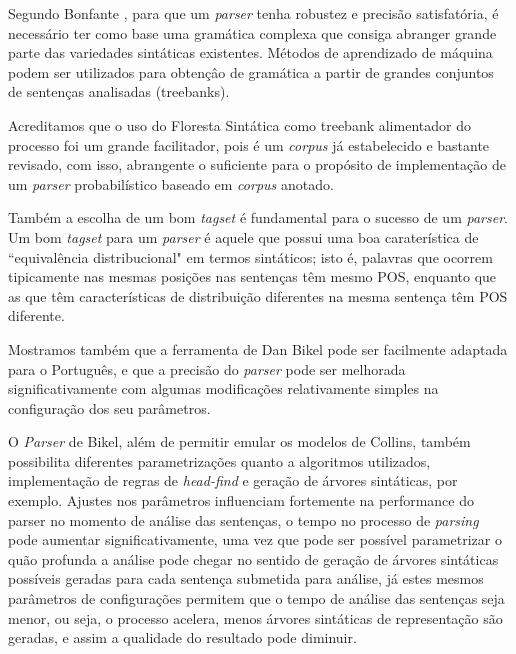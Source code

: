 Segundo Bonfante \cite{bonfante03}, para que um \emph{parser} tenha robustez e precisão satisfatória, é necessário ter como base uma gramática complexa que consiga abranger grande parte das variedades sintáticas existentes. Métodos de aprendizado de máquina podem ser utilizados para obtençâo de gramática a partir de grandes conjuntos de sentenças analisadas (treebanks). 

Acreditamos que o uso do Floresta Sintática como treebank alimentador do processo foi um grande facilitador, pois é um \emph{corpus} já estabelecido e bastante revisado, com isso, abrangente o suficiente para o propósito de implementação de um \emph{parser} probabilístico baseado em \emph{corpus} anotado.

Também a escolha de um bom \emph{tagset} é fundamental para o sucesso de um \emph{parser}. Um bom \emph{tagset} para um \emph{parser} é aquele que possui uma boa caraterística de ``equivalência distribucional" em termos sintáticos; isto é, palavras que ocorrem tipicamente nas mesmas posições nas sentenças têm mesmo POS, enquanto que as que têm características de distribuição diferentes na mesma sentença têm POS diferente. 


Mostramos também que a ferramenta de Dan Bikel pode ser facilmente adaptada para o Português, e que a precisão do \emph{parser}
pode ser melhorada significativamente com algumas modificações relativamente simples na configuração dos seu parâmetros.

O \emph{Parser} de Bikel, além de permitir emular os modelos de Collins, também possibilita diferentes parametrizações quanto a algoritmos utilizados, implementação de regras de \emph{head-find} e geração de árvores sintáticas, por exemplo. Ajustes nos parâmetros influenciam fortemente na performance do parser no momento de análise das sentenças, o tempo no processo de \emph{parsing} pode aumentar significativamente, uma vez que pode ser possível parametrizar o quão profunda a análise pode chegar no sentido de geração de árvores sintáticas possíveis geradas para cada sentença submetida para análise, já estes mesmos parâmetros de configurações permitem que o tempo de análise das sentenças seja menor, ou seja, o processo acelera, menos árvores sintáticas de representação são geradas, e assim a qualidade do resultado pode diminuir.

